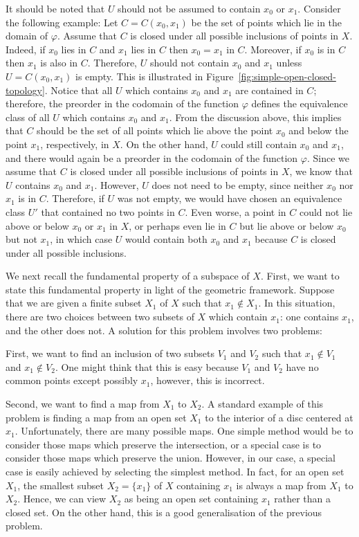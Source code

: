 \documentclass[a4paper,reqno,oneside]{article}
\begin{document}
It should be noted that $U$ should not be assumed to contain $x_0$ or $x_1$. Consider the following example: Let $C = C(x_0, x_1)$ be the set of points which lie in the domain of $\varphi$. Assume that $C$ is closed under all possible inclusions of points in $X$. Indeed, if $x_0$ lies in $C$ and $x_1$ lies in $C$ then $x_0 = x_1$ in $C$. Moreover, if $x_0$ is in $C$ then $x_1$ is also in $C$. Therefore, $U$ should not contain $x_0$ and $x_1$ unless $U = C(x_0, x_1)$ is empty. This is illustrated in Figure~\ref{fig:simple-open-closed-topology}. Notice that all $U$ which contains $x_0$ and $x_1$ are contained in $C$; therefore, the preorder in the codomain of the function $\varphi$ defines the equivalence class of all $U$ which contains $x_0$ and $x_1$. From the discussion above, this implies that $C$ should be the set of all points which lie above the point $x_0$ and below the point $x_1$, respectively, in $X$. On the other hand, $U$ could still contain $x_0$ and $x_1$, and there would again be a preorder in the codomain of the function $\varphi$. Since we assume that $C$ is closed under all possible inclusions of points in $X$, we know that $U$ contains $x_0$ and $x_1$. However, $U$ does not need to be empty, since neither $x_0$ nor $x_1$ is in $C$. Therefore, if $U$ was not empty, we would have chosen an equivalence class $U'$ that contained no two points in $C$. Even worse, a point in $C$ could not lie above or below $x_0$ or $x_1$ in $X$, or perhaps even lie in $C$ but lie above or below $x_0$ but not $x_1$, in which case $U$ would contain both $x_0$ and $x_1$ because $C$ is closed under all possible inclusions. 

We next recall the fundamental property of a subspace of $X$. First, we want to state this fundamental property in light of the geometric framework. Suppose that we are given a finite subset $X_1$ of $X$ such that $x_1 \notin X_1$. In this situation, there are two choices between two subsets of $X$ which contain $x_1$: one contains $x_1$, and the other does not. A solution for this problem involves two problems:

First, we want to find an inclusion of two subsets $V_1$ and $V_2$ such that $x_1 \notin V_1$ and $x_1 \notin V_2$. One might think that this is easy because $V_1$ and $V_2$ have no common points except possibly $x_1$, however, this is incorrect. 

Second, we want to find a map from $X_1$ to $X_2$. A standard example of this problem is finding a map from an open set $X_1$ to the interior of a disc centered at $x_1$. Unfortunately, there are many possible maps. One simple method would be to consider those maps which preserve the intersection, or a special case is to consider those maps which preserve the union. However, in our case, a special case is easily achieved by selecting the simplest method. In fact, for an open set $X_1$, the smallest subset $X_2 = \{x_1\}$ of $X$ containing $x_1$ is always a map from $X_1$ to $X_2$. Hence, we can view $X_2$ as being an open set containing $x_1$ rather than a closed set. On the other hand, this is a good generalisation of the previous problem. 
\end{document}
